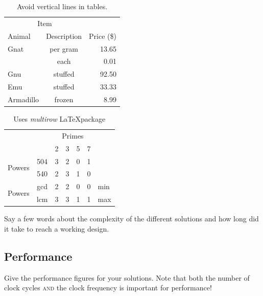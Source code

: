 \documentclass[11pt]{article}
\begin{document}
\begin{table}[htbp]
   \centering
   \begin{tabular}{@{} lcr @{}} %
      \toprule
      \multicolumn{2}{c}{Item} \\
      \cmidrule(r){1-2} %
      Animal    & Description & Price (\$)\\
      \midrule
      Gnat      & per gram & 13.65 \\
                & each     &  0.01 \\
      Gnu       & stuffed  & 92.50 \\
      Emu       & stuffed  & 33.33 \\
      Armadillo & frozen   &  8.99 \\
      \bottomrule
   \end{tabular}
   \caption{Avoid vertical lines in tables.}
   \label{tab:example}
\end{table}

\begin{table}[htbp]
   \centering 
 \begin{tabular}{cc|c|c|c|c|l}
\cline{3-6}
& & \multicolumn{4}{|c|}{Primes} \\ \cline{3-6}
& & 2 & 3 & 5 & 7 \\ \cline{1-6}
\multicolumn{1}{|c|}{\multirow{2}{*}{Powers}} &
\multicolumn{1}{|c|}{504} & 3 & 2 & 0 & 1 &     \\ \cline{2-6}
\multicolumn{1}{|c|}{}                        &
\multicolumn{1}{|c|}{540} & 2 & 3 & 1 & 0 &     \\ \cline{1-6}
\multicolumn{1}{|c|}{\multirow{2}{*}{Powers}} &
\multicolumn{1}{|c|}{gcd} & 2 & 2 & 0 & 0 & min \\ \cline{2-6}
\multicolumn{1}{|c|}{}                        &
\multicolumn{1}{|c|}{lcm} & 3 & 3 & 1 & 1 & max \\ \cline{1-6}
\end{tabular}
  \caption{Uses \textit{multirow} \LaTeX package}
   \label{tab:example2}
\end{table}
Say a few words about the complexity of the different solutions and how long did it take to reach a working design.
 
\subsection{Performance}
Give the performance figures for your solutions. Note that both the number of clock cycles \textsc{and} the clock frequency is important for performance! 
\end{document}
